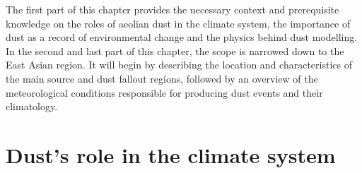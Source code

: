 
The first part of this chapter provides the necessary context and prerequisite knowledge on the roles of aeolian dust in the climate system, the importance of dust as a record of environmental change and the physics behind dust modelling. In the second and last part of this chapter, the scope is narrowed down to the East Asian region. It will begin by describing the location and characteristics of the main source and dust fallout regions, followed by an overview of the meteorological conditions responsible for producing dust events and their climatology. 

\section{Dust's role in the climate system}\label{seq:physics_of_dust}

